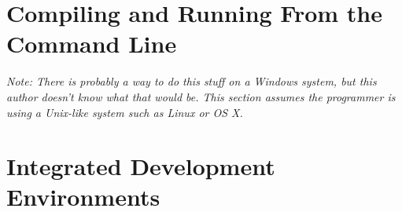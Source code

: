 \section{Compiling and Running From the Command Line}
\textit{Note: There is probably a way to do this stuff on a Windows system, but this author doesn't know what that would be.  This section assumes the programmer is using a Unix-like system such as Linux or OS X.}



\section{Integrated Development Environments}
